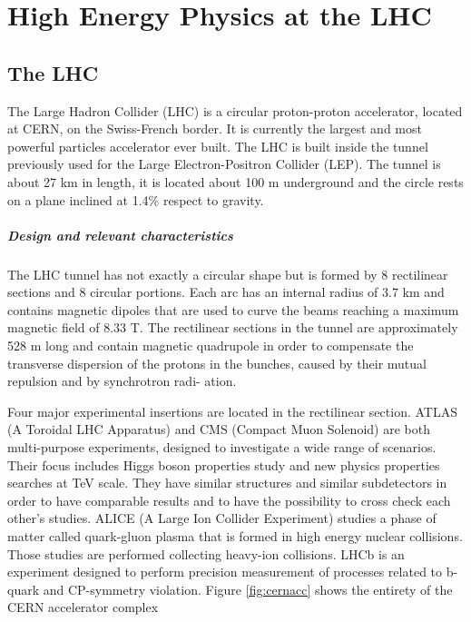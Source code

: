 \chapter{High Energy Physics at the LHC}\label{ch:plhc} %

\section{The LHC}

The Large Hadron Collider (LHC) is a circular proton-proton accelerator, located at
CERN, on the Swiss-French border. It is currently the largest and most powerful
particles accelerator ever built. The LHC is built inside the tunnel previously used
for the Large Electron-Positron Collider (LEP). The tunnel is about 27 km in length,
it is located about 100 m underground and the circle rests on a plane inclined
at 1.4$\%$ respect to gravity.

\paragraph{Design and relevant characteristics}

The LHC tunnel has not exactly a circular shape but is formed by 8 rectilinear sections and 8 circular portions. Each arc has an internal radius of 3.7 km and contains
magnetic dipoles that are used to curve the beams reaching a maximum magnetic
field of 8.33 T. The rectilinear sections in the tunnel are approximately 528 m long and contain magnetic quadrupole in order to compensate the transverse dispersion of the
protons in the bunches, caused by their mutual repulsion and by synchrotron radi-
ation.


Four major experimental insertions are located in the rectilinear section. ATLAS (A Toroidal
LHC Apparatus) and CMS (Compact Muon Solenoid) are both multi-purpose experiments, designed to
investigate a wide range of scenarios. Their focus includes Higgs boson properties
study and new physics properties searches at TeV scale. They have similar structures and similar subdetectors in order to have comparable results and to have the
possibility to cross check each other’s studies. ALICE (A Large Ion Collider Experiment) studies a phase of matter called quark-gluon plasma that is formed in
high energy nuclear collisions. Those studies are performed collecting heavy-ion
collisions. LHCb is an experiment designed to perform precision measurement of processes related to b-quark and CP-symmetry violation. Figure \ref{fig:cernacc} shows the entirety of the CERN accelerator complex

